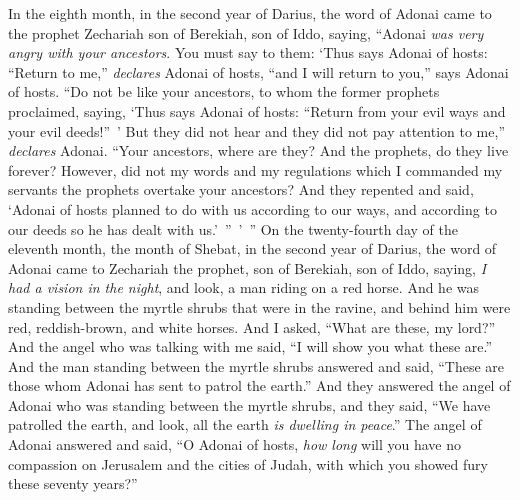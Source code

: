 
\begin{biblechapter} %
\verse In the eighth month, in the second year of Darius, the word of Adonai came to the prophet Zechariah son of Berekiah, son of Iddo, saying,
\verse “Adonai \textit{was very angry with your ancestors}.
\verse You must say to them: ‘Thus says Adonai of hosts: “Return to me,” \textit{declares} Adonai of hosts, “and I will return to you,” says Adonai of hosts.
\verse “Do not be like your ancestors, to whom the former prophets proclaimed, saying, ‘Thus says Adonai of hosts: “Return from your evil ways and your evil deeds!” ’ But they did not hear and they did not pay attention to me,” \textit{declares} Adonai.
\verse “Your ancestors, where are they? And the prophets, do they live forever?
\verse However, did not my words and my regulations which I commanded my servants the prophets overtake your ancestors? And they repented and said, ‘Adonai of hosts planned to do with us according to our ways, and according to our deeds so he has dealt with us.’ ” ’ ”
 On the twenty-fourth day of the eleventh month, the month of Shebat, in the second year of Darius, the word of Adonai came to Zechariah the prophet, son of Berekiah, son of Iddo, saying,
\verse \textit{I had a vision in the night}, and look, a man riding on a red horse. And he was standing between the myrtle shrubs that were in the ravine, and behind him were red, reddish-brown, and white horses.
\verse And I asked, “What are these, my lord?” And the angel who was talking with me said, “I will show you what these are.”
\verse And the man standing between the myrtle shrubs answered and said, “These are those whom Adonai has sent to patrol the earth.”
\verse And they answered the angel of Adonai who was standing between the myrtle shrubs, and they said, “We have patrolled the earth, and look, all the earth \textit{is dwelling in peace}.”
\verse The angel of Adonai answered and said, “O Adonai of hosts, \textit{how long} will you have no compassion on Jerusalem and the cities of Judah, with which you showed fury these seventy years?”

\end{biblechapter}
